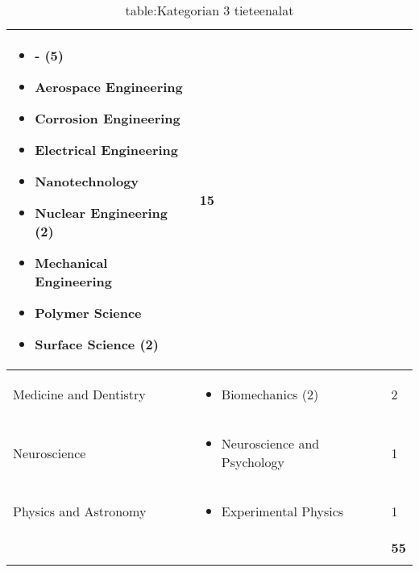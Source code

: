 \documentclass[utf8]{gradu3}
\begin{document}
\begin{longtable}[h]{|p{5cm}|p{8cm}|p{1cm}|}
\begin{itemize}
\begin{itemize}[noitemsep,nolistsep]
            \item - (5)
            \item Aerospace Engineering
            \item Corrosion Engineering
            \item Electrical Engineering
            \item Nanotechnology
            \item Nuclear Engineering (2)
            \item Mechanical Engineering
            \item Polymer Science
            \item Surface Science (2)
        \end{itemize}
    \end{itemize}& 15 \\
     \hline
     Medicine and Dentistry & \begin{itemize}
         \item Biomechanics (2)
     \end{itemize} & 2 \\
     \hline
     Neuroscience & \begin{itemize}
         \item Neuroscience and Psychology
     \end{itemize} & 1 \\
     \hline
     Physics and Astronomy & \begin{itemize}
         \item Experimental Physics
     \end{itemize} & 1 \\
     \hline
       &   & \textbf{55} \\
    \hline
    \caption{table:Kategorian 3 tieteenalat}
    \label{table:Kategorian 3 tieteenalat}
\end{longtable}
\end{document}
